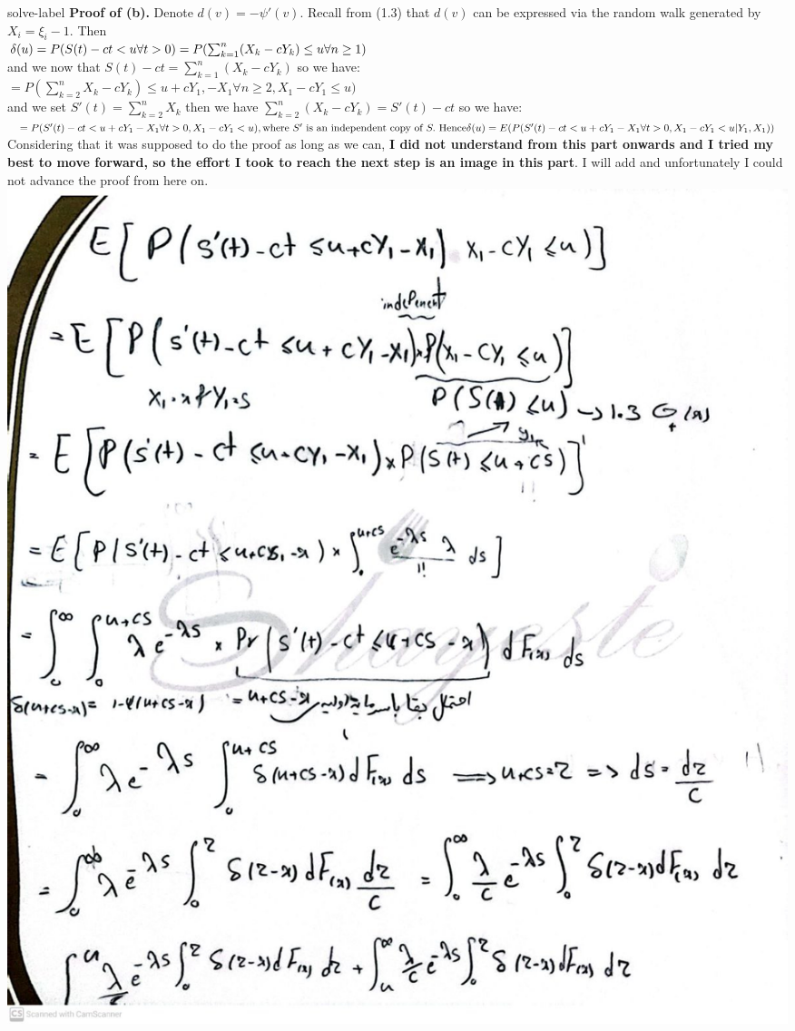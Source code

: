 	\begin{solve}{}{solve-label}
		\textbf{Proof of (b).} Denote $d(v) = -\psi'(v)$. Recall from (1.3) that $d(v)$ can be expressed via the random walk generated by $X_{i} = \xi_{i} - 1$. Then\\
		$\delta(u) = P(S(t) - ct < u \forall t > 0) \\
		= P ( \sum_{k=1}^{n} (X_k - cY_k)  \leq u \forall n \geq 1 ) $ \\
		and we now that $S(t) - ct = \sum_{k=1}^{n} (X_k -cY_k)$ so we have:\\
		$= P(\sum_{k=2}^{n} X_k - cY_k)\leq u + cY_1, - X_1  \forall n \geq 2 , X_1 - cY_1 \leq u)$ \\
		and we set $S\prime(t) = \sum_{k=2}^{n} X_k$ then we have $\sum_{k=2}^{n} (X_k -cY_k) = S\prime(t) -ct$ so we have:\\
		$= P(S'(t)-ct<u+cY_1-X_1 \forall t>0 , X_1-cY_1<u), \\
		\text{where } S' \text{ is an independent copy of } S. \text{ Hence} \\
		\delta(u)=E(P(S'(t)-ct<u+cY_1-X_1 \forall t>0 , X_1-cY_1<u|Y_1,X_1))$\\
		Considering that it was supposed to do the proof as long as we can, \textbf{I did not understand from this part onwards and I tried my best to move forward, so the effort I took to reach the next step is an image in this part}. I will add and unfortunately I could not advance the proof from here on.
		\includegraphics[width = \textwidth]{pic2.jpg}
	\end{solve}
	
	
